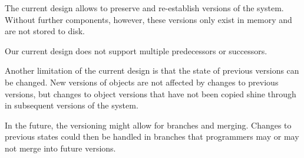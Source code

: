 The current design allows to preserve and re-establish versions of the system.
Without further components, however, these versions only exist in memory and are not stored to disk.

Our current design does not support multiple predecessors or successors.

Another limitation of the current design is that the state of previous versions can be changed.
New versions of objects are not affected by changes to previous versions, but changes to object versions that have not been copied shine through in subsequent versions of the system.

In the future, the versioning might allow for branches and merging.
Changes to previous states could then be handled in branches that programmers may or may not merge into future versions.




















% 

% 
% 
% 
% 
% 














